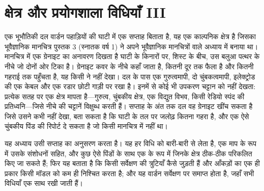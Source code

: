 \chapter{क्षेत्र और प्रयोगशाला विधियाँ III}\label{ch:b3:field-lab-methods-3}

एक भूभौतिकी दल वार्डन पहाड़ियों की घाटी में एक सप्ताह बिताता है, यह एक काल्पनिक क्षेत्र है
जिसका भूवैज्ञानिक मानचित्र पुस्तक 3 (स्नातक वर्ष 1) ने अपने
भूवैज्ञानिक मानचित्रों वाले अध्याय में बनाया था। मानचित्र में एक ग्रेनाइट का अनावरण दिखता है
घाटी के किनारों पर, शिस्ट के बीच, उस बलुआ पत्थर के नीचे जो
दोनों ओर टिका है। ग्रेनाइट कवर के नीचे कहाँ जाता है, कितनी दूर
तक फैला है और कितनी गहराई तक पहुँचता है, यह किसी ने नहीं देखा।
दल के पास एक गुरुत्वमापी, दो चुंबकत्वमापी, इलेक्ट्रोड की एक केबल और एक रडार
छोटी गाड़ी पर रखा है। इनमें से कोई भी उपकरण चट्टान को नहीं देखता: प्रत्येक
सतह पर एक क्षेत्र मापता है---गुरुत्व, चुंबकीय क्षेत्र, एक विद्युत विभव,
किसी रेडियो स्पंद की प्रतिध्वनि---जिसे नीचे की चट्टानें विक्षुब्ध करती हैं।
सप्ताह के अंत तक दल वह ग्रेनाइट खींच सकता है जिसे उसने कभी नहीं देखा,
बता सकता है कि घाटी के तल पर जलोढ़ कितना गहरा है, और एक ऐसे चुंबकीय पिंड की
रिपोर्ट दे सकता है जो किसी मानचित्र में नहीं था।

यह अध्याय उसी सप्ताह का अनुसरण करता है। यह हर विधि को बारी-बारी से लेता है, एक माप के रूप में
उसके संशोधनों सहित, और कुछ ऐसे पिंडों के साथ एक  के रूप में जिनके क्षेत्र
ठीक-ठीक परिकलित किए जा सकते हैं; फिर यह बताता है कि किसी सर्वेक्षण की त्रुटियाँ कैसे
जुड़ती हैं और आँकड़ों का एक ही प्रकार किसी मॉडल को कम ही
निश्चित करता है; और यह वार्डन सर्वेक्षण पर समाप्त होता है, जहाँ सभी विधियाँ
एक साथ रखी जाती हैं।

